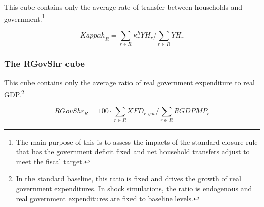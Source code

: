 This cube contains only the average rate of transfer between households and
government.\footnote{The main purpose of this is to assess the impacts of the
standard closure rule that has the government deficit fixed and net household
transfers adjust to meet the fiscal target.}

\[
\mathit{Kappah}_{R} = \sum_{r \in R} {\kappa^h_r \mathit{YH}_{r}} \bigg/ \sum_{r \in R} {\mathit{YH}_{r}}
\]

\subsubsection{The RGovShr cube}

This cube contains only the average ratio of real
government expenditure to real GDP.\footnote{In the standard baseline, this
ratio is fixed and drives the growth of real government expenditures.
In shock simulations, the ratio is endogenous and real government
expenditures are fixed to baseline levels.}

\[
\mathit{RGovShr}_{R} = 100 \cdot \sum_{r \in R} {\mathit{XFD}_{r,\mathit{gov}}} \bigg/ \sum_{r \in R} {\mathit{RGDPMP}_{r}}
\]

\clearpage

